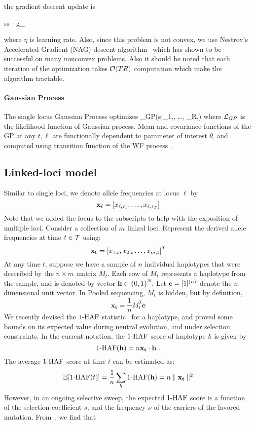 the gradient descent update is

\beq
s\leftarrow s - \eta  g_\ell
\eeq

where $\eta$ is learning rate. Also, since
this problem is not convex, we use Nestrov's Accelerated Gradient
(NAG) descent algorithm~\cite{XXX} which has shown to be successful on
many nonconvex problems. Also it should be noted that each iteration
of the optimization takes ${\cal O}(TR)$ computation which make the
algorithm tractable.


\paragraph{Gaussian Process}
The single locus Gaussian Process \cite{} optimizes
\beq
\Lc_{GP}(s|\bfx_{1,\ell}, \dots, \bfx_{R,\ell})
\eeq
where ${\cal L}_{GP}$ is the likelihood function  of Gaussian process. Mean and covariance functions of the GP at any $t,\ell$ are functionally dependent to parameter of interest $\theta$, and computed using transition function of the WF process \cite{EandR-GP}.

\subsection*{Linked-loci model}
Similar to single loci, we denote allele frequencies at locus $\ell$ by
\[
{\bf x_{\ell}} = [x_{\ell,\tau_1},\ldots,x_{\ell,\tau_T}]
\]
Note that we added the locus to the subscripts to help with the
exposition of multiple loci. Consider a collection of $m$ linked
loci. Represent the derived allele frequencies at time $t\in {\cal T}$
using:
\[
{\bf x_t} = [x_{1,t},x_{2,t}\ldots,x_{m,t}]^T 
\]
At any time $t$, suppose we have a sample of $n$ individual haplotypes
that were described by the $n\times m$ matrix $M_t$. Each row of $M_t$
represents a haplotype from the sample, and is denoted by vector
$\mathbf{h} \in \{0,1\}^m$. Let ${\bf e} = [1]^{(n)}$ denote the
$n$-dimensional unit vector. In Pooled sequencing, $M_t$ is hidden,
but by definition,
\[
 \mathbf{x_t} = \frac{1}{n} M_t^T\mathbf{e}
\]
We recently devised the $1\text{-HAF}$ statistic~\cite{Ronen2015} for a
haplotype, and proved some bounds on its expected value during neutral
evolution, and under selection constraints. In the current notation,
the $1\text{-HAF}$ score of haplotype $h$ is given by
\begin{equation}
1\text{-HAF}(\mathbf{h})=n\mathbf{x_t} \cdot \mathbf{h}
\;.
\label{eq:1-HAF_SNPmatrix}
\end{equation}
The average $1\text{-HAF}$ score at time $t$ can be estimated as:
\begin{equation} 
\mathbb{E}[1\text{-HAF}(t)]=\frac{1}{n}\sum_h 1\text{-HAF}(\mathbf{h}) = n\parallel \mathbf{x_t}\parallel^2
\end{equation} 
However, in an ongoing selective sweep, the expected $1\text{-HAF}$ score is
a function of the selection coefficient $s$, and the frequency $\nu$
of the carriers of the favored mutation. From~\cite{Ronen2015}, we
find that

